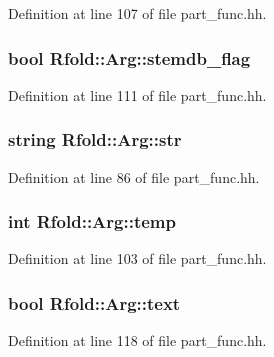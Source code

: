 Definition at line 107 of file part\+\_\+func.\+hh.

\hypertarget{class_rfold_1_1_arg_ad5d34ff788f8795f1e75f313dd67c79e}{
\subsubsection[{stemdb\+\_\+flag}]{\setlength{\rightskip}{0pt plus 5cm}bool Rfold\+::\+Arg\+::stemdb\+\_\+flag}}\label{class_rfold_1_1_arg_ad5d34ff788f8795f1e75f313dd67c79e}


Definition at line 111 of file part\+\_\+func.\+hh.

\hypertarget{class_rfold_1_1_arg_a10258eb45eb764844e49e5587e187af7}{
\subsubsection[{str}]{\setlength{\rightskip}{0pt plus 5cm}string Rfold\+::\+Arg\+::str}}\label{class_rfold_1_1_arg_a10258eb45eb764844e49e5587e187af7}


Definition at line 86 of file part\+\_\+func.\+hh.

\hypertarget{class_rfold_1_1_arg_a25e15defa3a3a80e6a0593989ea9e44a}{
\subsubsection[{temp}]{\setlength{\rightskip}{0pt plus 5cm}int Rfold\+::\+Arg\+::temp}}\label{class_rfold_1_1_arg_a25e15defa3a3a80e6a0593989ea9e44a}


Definition at line 103 of file part\+\_\+func.\+hh.

\hypertarget{class_rfold_1_1_arg_ad174f7be713784b338a8e3423c950dac}{
\subsubsection[{text}]{\setlength{\rightskip}{0pt plus 5cm}bool Rfold\+::\+Arg\+::text}}\label{class_rfold_1_1_arg_ad174f7be713784b338a8e3423c950dac}


Definition at line 118 of file part\+\_\+func.\+hh.

